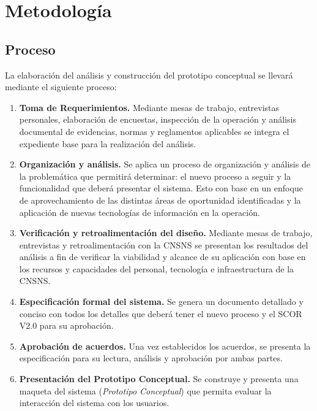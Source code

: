 \documentclass[10pt]{book}
\begin{document}
	
\chapter{Metodología}


\section{Proceso}

	La elaboración del análisis y construcción del prototipo conceptual se llevará mediante el siguiente proceso:
	
	
\begin{enumerate}
	\item {\bf Toma de Requerimientos.} Mediante mesas de trabajo, entrevistas personales, elaboración de encuestas, inspección de la operación y análisis documental de evidencias, normas y reglamentos aplicables se integra el expediente base para la realización del análisis.
	\item {\bf Organización y análisis.} Se aplica un proceso de organización y análisis de la problemática que permitirá determinar: el nuevo proceso a seguir y la funcionalidad que deberá presentar el sistema. Esto con base en un enfoque de aprovechamiento de las distintas áreas de oportunidad identificadas y la aplicación de nuevas tecnologías de información en la operación.
	\item {\bf Verificación y retroalimentación del diseño.} Mediante mesas de trabajo, entrevistas y retroalimentación con la CNSNS se presentan los resultados del análisis a fin de verificar la viabilidad y alcance de su aplicación con base en los recursos y capacidades del personal, tecnología e infraestructura de la CNSNS.
	\item {\bf Especificación formal del sistema.} Se genera un documento detallado y conciso con todos los detalles que deberá tener el nuevo proceso y el SCOR V2.0 para su aprobación.  
	\item {\bf Aprobación de acuerdos.} Una vez establecidos los acuerdos, se presenta la especificación para su lectura, análisis y aprobación por ambas partes.
	\item {\bf Presentación del Prototipo Conceptual.} Se construye y presenta una maqueta del sistema ({\em Prototipo Conceptual}) que permita evaluar la interacción del sistema con los usuarios.
\end{enumerate}
\end{document}
